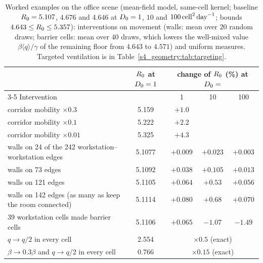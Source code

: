\begin{table}[tbp]
  \centering
  \caption{Worked examples on the office scene (mean-field model, same-cell kernel; baseline $R_0=5.107$,
  $4.676$ and $4.646$ at $D_0=1$, $10$ and $100\,\mathrm{cell}^2\,\mathrm{day}^{-1}$; bounds $4.643\le R_0\le5.357$): interventions on
  movement (walls: mean over $20$ random draws; barrier cells: mean over $40$ draws, which lowers the
  well-mixed value $\beta\langle q\rangle/\gamma$ of the remaining floor from $4.643$ to $4.571$) and uniform
  measures. Targeted ventilation is in Table~\ref{s4_geometry:tab:targeting}.}
  \label{s4_geometry:tab:office}
  \small
  \setlength{\tabcolsep}{4.5pt}
  \begin{tabular}{@{}lcccc@{}}
    \toprule
     & $R_0$ at $D_0=1$ & \multicolumn{3}{c}{change of $R_0$ (\%) at $D_0=$} \\
    \cmidrule(l){3-5}
    Intervention & & 1 & 10 & 100 \\
    \midrule
    corridor mobility $\times0.3$ & 5.159 & $+1.0$ & & \\
    corridor mobility $\times0.1$ & 5.222 & $+2.2$ & & \\
    corridor mobility $\times0.01$ & 5.325 & $+4.3$ & & \\
    walls on 24 of the 242 workstation--workstation edges & 5.1077 & $+0.009$ & $+0.023$ & $+0.003$ \\
    walls on 73 edges & 5.1092 & $+0.038$ & $+0.105$ & $+0.013$ \\
    walls on 121 edges & 5.1105 & $+0.064$ & $+0.53$ & $+0.056$ \\
    walls on 142 edges (as many as keep the room connected) & 5.1114 & $+0.080$ & $+0.68$ & $+0.070$ \\
    39 workstation cells made barrier cells & 5.1106 & $+0.065$ & $-1.07$ & $-1.49$ \\
    $q\to q/2$ in every cell & 2.554 & \multicolumn{3}{c}{$\times0.5$ (exact)} \\
    $\beta\to0.3\beta$ and $q\to q/2$ in every cell & 0.766 & \multicolumn{3}{c}{$\times0.15$ (exact)} \\
    \bottomrule
  \end{tabular}

\end{table}

